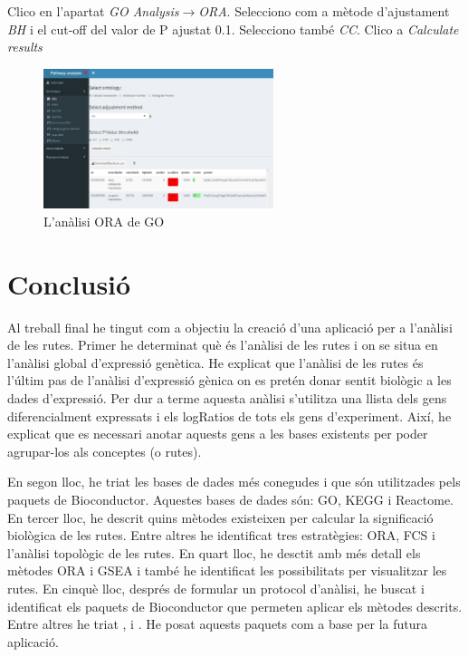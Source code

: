 Clico en l'apartat \textit{\gls{GO} Analysis}$\rightarrow$\textit{ORA}. Selecciono com a mètode d'ajustament \textit{BH} i el cut-off del valor de P ajustat 0.1. Selecciono també \textit{CC}. Clico a \textit{Calculate results}
\begin{figure}[H]
\centering
\includegraphics[width=0.6\textwidth]{figures/Estudi1_Fig13_GO.png} 
\caption{L'anàlisi \gls{ORA} de \gls{GO}}
\end{figure}

\chapter{Conclusió}

Al treball final he tingut com a objectiu la creació d'una aplicació per a l’anàlisi de les rutes. Primer he determinat què és l'anàlisi de les rutes i on se situa en l'anàlisi global d'expressió genètica. He explicat que l'anàlisi de les rutes és l'últim pas de l'anàlisi d'expressió gènica on es pretén donar sentit biològic a les dades d'expressió. Per dur a terme aquesta anàlisi s'utilitza una llista dels gens diferencialment expressats i els logRatios de tots els gens d'experiment. Així, he explicat que es necessari anotar aquests gens a les bases existents per poder agrupar-los als conceptes (o rutes). 

En segon lloc, he triat les bases de dades més conegudes i que són utilitzades pels paquets de \gls{Bioconductor}. Aquestes bases de dades són: \gls{GO}, \gls{KEGG} i Reactome. En tercer lloc, he descrit quins mètodes existeixen per calcular la significació biològica de les rutes. Entre altres he identificat tres estratègies: \gls{ORA}, \gls{FCS} i l'anàlisi topològic de les rutes. En quart lloc, he desctit amb més detall els mètodes \gls{ORA} i \gls{GSEA} i també he identificat les possibilitats per visualitzar les rutes. En cinquè lloc, després de formular un protocol d'anàlisi, he buscat i identificat els paquets de \gls{Bioconductor} que permeten aplicar els mètodes descrits. Entre altres he triat ,  i . He posat aquests paquets com a base per la futura aplicació. 

